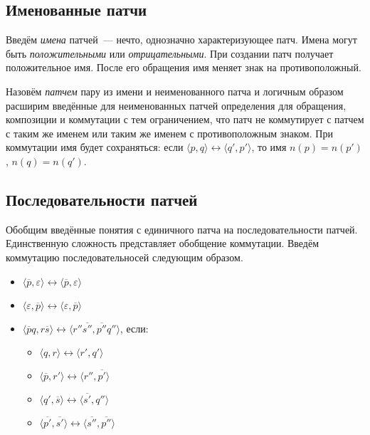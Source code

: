 \subsection{Именованные патчи}

Введём \emph{имена} патчей~--- нечто, однозначно характеризующее патч.
Имена могут быть \emph{положительными} или \emph{отрицательными}. При
создании патч получает положительное имя. После его обращения имя
меняет знак на противоположный. 

Назовём \emph{патчем} пару из имени и неименованного патча и логичным
образом расширим введённые для неименованных патчей определения для
обращения, композиции и коммутации с тем ограничением, что патч не
коммутирует с патчем с таким же именем или таким же именем с
противоположным знаком. При коммутации имя будет сохраняться: если
$\langle p, q \rangle \longleftrightarrow \langle q', p' \rangle$, то
имя $n(p) = n(p')$, $n(q) = n(q')$.

\subsection{Последовательности патчей}

Обобщим введённые понятия с единичного патча на последовательности
патчей. Единственную сложность представляет обобщение коммутации.
Введём коммутацию последовательносей следующим образом.

\begin{itemize}
\item $\langle \overline{p}, \varepsilon \rangle \longleftrightarrow
  \langle \overline{p}, \varepsilon \rangle$
\item $\langle \varepsilon, \overline{p} \rangle \longleftrightarrow
  \langle \varepsilon, \overline{p} \rangle$
\item $\langle \overline{p}q, r\overline{s} \rangle \longleftrightarrow
  \langle r''\overline{s''}, \overline{p''}q''
  \rangle$, если:
  \begin{itemize}
  \item $\langle q, r \rangle \longleftrightarrow \langle r', q' \rangle$
  \item $\langle \overline{p}, r' \rangle \longleftrightarrow \langle
    r'', \overline{p'} \rangle$
  \item $\langle q', \overline{s} \rangle \longleftrightarrow \langle
    \overline{s'}, q'' \rangle$
  \item $\langle \overline{p'}, \overline{s'} \rangle
    \longleftrightarrow \langle \overline{s''}, \overline{p''} \rangle$
  \end{itemize}
\end{itemize}

